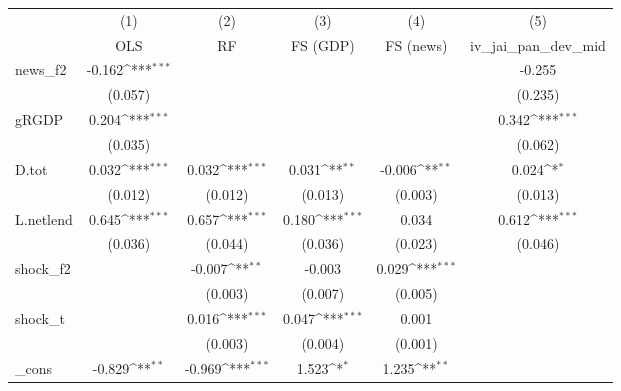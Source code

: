 {
\def\sym#1{\ifmmode^{#1}\else\(^{#1}\)\fi}
\begin{tabular}{l*{5}{c}}
\toprule
            &\multicolumn{1}{c}{(1)}&\multicolumn{1}{c}{(2)}&\multicolumn{1}{c}{(3)}&\multicolumn{1}{c}{(4)}&\multicolumn{1}{c}{(5)}\\
            &\multicolumn{1}{c}{OLS}&\multicolumn{1}{c}{RF}&\multicolumn{1}{c}{FS (GDP)}&\multicolumn{1}{c}{FS (news)}&\multicolumn{1}{c}{iv\_jai\_pan\_dev\_mid}\\
\midrule
news\_f2     &      -0.162\sym{***}&                     &                     &                     &      -0.255         \\
            &     (0.057)         &                     &                     &                     &     (0.235)         \\
\addlinespace
gRGDP       &       0.204\sym{***}&                     &                     &                     &       0.342\sym{***}\\
            &     (0.035)         &                     &                     &                     &     (0.062)         \\
\addlinespace
D.tot       &       0.032\sym{***}&       0.032\sym{***}&       0.031\sym{**} &      -0.006\sym{**} &       0.024\sym{*}  \\
            &     (0.012)         &     (0.012)         &     (0.013)         &     (0.003)         &     (0.013)         \\
\addlinespace
L.netlend   &       0.645\sym{***}&       0.657\sym{***}&       0.180\sym{***}&       0.034         &       0.612\sym{***}\\
            &     (0.036)         &     (0.044)         &     (0.036)         &     (0.023)         &     (0.046)         \\
\addlinespace
shock\_f2    &                     &      -0.007\sym{**} &      -0.003         &       0.029\sym{***}&                     \\
            &                     &     (0.003)         &     (0.007)         &     (0.005)         &                     \\
\addlinespace
shock\_t     &                     &       0.016\sym{***}&       0.047\sym{***}&       0.001         &                     \\
            &                     &     (0.003)         &     (0.004)         &     (0.001)         &                     \\
\addlinespace
\_cons      &      -0.829\sym{**} &      -0.969\sym{***}&       1.523\sym{*}  &       1.235\sym{**} &                     \\

\end{tabular}}
